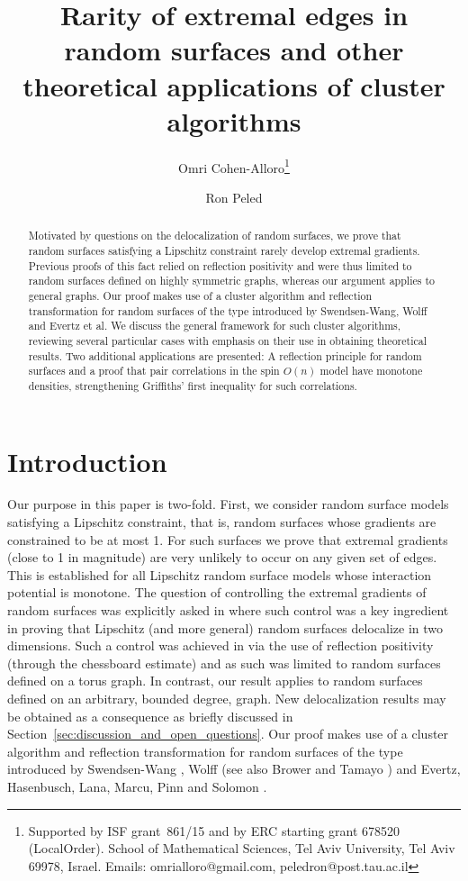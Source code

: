 \documentclass[english]{article}
\title{Rarity of extremal edges in random surfaces and other theoretical applications of cluster algorithms}
\author{Omri Cohen-Alloro\thanks{Supported by ISF grant~861/15 and by ERC starting grant 678520 (LocalOrder). School of Mathematical Sciences, Tel Aviv
University, Tel Aviv 69978, Israel. Emails: omrialloro@gmail.com,
peledron@post.tau.ac.il} \and Ron Peled\footnotemark[1] }
\theoremstyle{plain}
\theoremstyle{plain}
\begin{document}
\maketitle
\begin{abstract}
Motivated by questions on the delocalization of random surfaces, we prove that random surfaces satisfying a Lipschitz constraint rarely
develop extremal gradients. Previous proofs of this fact relied on
reflection positivity and were thus limited to random surfaces defined on
highly symmetric graphs, whereas our argument applies to general graphs. Our proof makes use of a cluster algorithm and reflection transformation for random surfaces of the type introduced by Swendsen-Wang, Wolff and Evertz et al. We discuss the general framework for such cluster algorithms, reviewing several particular cases with emphasis on their use in obtaining theoretical results. Two additional applications are presented: A reflection principle for random surfaces and a proof that pair correlations in the spin $O(n)$ model have monotone densities, strengthening
Griffiths' first inequality for such correlations.
\end{abstract}

\section{Introduction }\label{sec:introduction}
Our purpose in this paper is two-fold. First, we consider random
surface models satisfying a Lipschitz constraint, that is, random surfaces
whose gradients are constrained to be at most 1. For such surfaces
we prove that extremal gradients (close to 1 in magnitude) are very
unlikely to occur on any given set of edges. This is established for
all Lipschitz random surface models whose interaction potential is
monotone. The question of controlling the extremal gradients of
random surfaces was explicitly asked in \cite[Section
6]{milos2015delocalization} where such control was a key ingredient
in proving that Lipschitz (and more general) random surfaces
delocalize in two dimensions. Such a control was achieved in
\cite{milos2015delocalization} via the use of reflection positivity
(through the chessboard estimate) and as such was limited to random
surfaces defined on a torus graph. In contrast, our result applies
to random surfaces defined on an arbitrary, bounded degree, graph. New delocalization results may be obtained as a consequence as briefly discussed in Section~\ref{sec:discussion_and_open_questions}. Our proof makes use of a cluster algorithm and reflection transformation  for random surfaces of the type introduced by Swendsen-Wang \cite{swendsen1987nonuniversal}, Wolff \cite{wolff1989collective} (see also Brower
and Tamayo \cite{brower1989embedded}) and Evertz, Hasenbusch, Lana, Marcu, Pinn
and Solomon \cite{evertz1991stochastic, hasenbusch1992cluster}.
\end{document}
